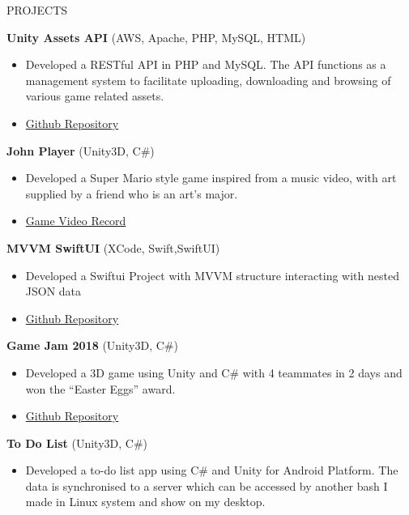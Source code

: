 \documentclass{resume} %
\begin{document}
\begin{rSection}{PROJECTS}
\vspace{-1.25em}
\item \textbf{Unity Assets API} \hfill (AWS, Apache, PHP, MySQL, HTML) 
\begin{itemize}
    \itemsep -3pt {} 
    \item Developed a RESTful API in PHP and MySQL. The API functions as a management system to facilitate uploading, downloading and browsing of various game related assets.
    \item \href {https://github.com/AmousQiu/UnityAssetsAPI}{Github Repository} 
\end{itemize}
\vspace{1.25em}
\item \textbf{John Player} \hfill(Unity3D, C\#) 
\begin{itemize}
    \itemsep -3pt {} 
    \item {Developed a Super Mario style game inspired from a music video, with art supplied by a friend who is an art's major.}
    \item \href{https://www.youtube.com/watch?v=pTpe66NKL0E&t=244s}{Game Video Record}
\end{itemize}
\vspace{1.25em}
\item \textbf{MVVM SwiftUI} \hfill(XCode, Swift,SwiftUI)
\begin{itemize}
    \itemsep -3pt {} 
    \item {Developed a Swiftui Project with MVVM structure interacting with nested JSON data}
    \item \href{https://github.com/AmousQiu/MVVM_SwiftUI}{Github Repository}
\end{itemize}
\vspace{1.25em}
\item \textbf{Game Jam 2018} \hfill(Unity3D, C\#)
\begin{itemize}
    \itemsep -3pt {} 
    \item {Developed a 3D game using Unity and C\# with 4 teammates in 2 days and won the “Easter Eggs” award.}
    \item \href{https://github.com/AmousQiu/hai}{Github Repository}
\end{itemize}
\vspace{1.25em}
\item \textbf{To Do List} \hfill(Unity3D, C\#)
\begin{itemize}
    \itemsep -3pt {} 
    \item {Developed a to-do list app using C\# and Unity for Android Platform. The data is synchronised to a server which can be accessed by another bash I made in Linux system and show on my desktop.}

\end{itemize}
\end{rSection}
\end{document}
